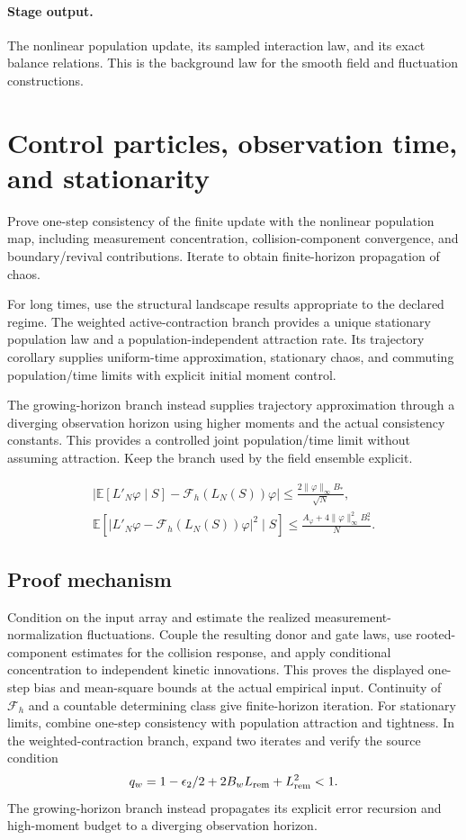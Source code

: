 \documentclass[11pt,a4paper]{article}
\begin{document}
\paragraph{Stage output.} The nonlinear population update, its sampled interaction law, and its exact balance relations. This is the background law for the smooth field and fluctuation constructions.

\section{Control particles, observation time, and stationarity}
\label{stage:6}
Prove one-step consistency of the finite update with the nonlinear population map, including measurement concentration, collision-component convergence, and boundary/revival contributions. Iterate to obtain finite-horizon propagation of chaos.

For long times, use the structural landscape results appropriate to the declared regime. The weighted active-contraction branch provides a unique stationary population law and a population-independent attraction rate. Its trajectory corollary supplies uniform-time approximation, stationary chaos, and commuting population/time limits with explicit initial moment control.

The growing-horizon branch instead supplies trajectory approximation through a diverging observation horizon using higher moments and the actual consistency constants. This provides a controlled joint population/time limit without assuming attraction. Keep the branch used by the field ensemble explicit.


\begin{gather*}
\left|\mathbb E[L'_N\varphi\mid S]-\mathcal F_h(L_N(S))\varphi\right|
\le\frac{2\|\varphi\|_\infty B_*}{\sqrt N},\\
\mathbb E\!\left[|L'_N\varphi-\mathcal F_h(L_N(S))\varphi|^2\mid S\right]
\le\frac{A_\varphi+4\|\varphi\|_\infty^2B_*^2}{N}.
\end{gather*}
\subsection*{Proof mechanism}
Condition on the input array and estimate the realized measurement-normalization fluctuations. Couple the resulting donor and gate laws, use rooted-component estimates for the collision response, and apply conditional concentration to independent kinetic innovations. This proves the displayed one-step bias and mean-square bounds at the actual empirical input. Continuity of \(\mathcal F_h\) and a countable determining class give finite-horizon iteration. For stationary limits, combine one-step consistency with population attraction and tightness. In the weighted-contraction branch, expand two iterates and verify the source condition
\[q_w=1-\epsilon_2/2+2B_wL_{\rm rem}+L_{\rm rem}^2<1.\]
The growing-horizon branch instead propagates its explicit error recursion and high-moment budget to a diverging observation horizon.
\end{document}
